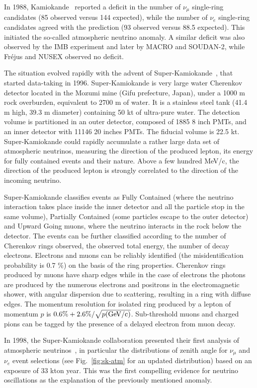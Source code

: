 In 1988, Kamiokande~\cite{kam88} reported a deficit in the number of $\nu_\mu$ single-ring candidates (85 observed versus 144 expected), while the number of $\nu_e$ single-ring candidates agreed with the prediction (93 observed versus 88.5 expected). 
This initiated the so-called atmospheric neutrino anomaly. A similar deficit was also observed by the IMB experiment and later by MACRO and SOUDAN-2, while Fr\'ejus and NUSEX observed no deficit. 

The situation evolved rapidly with the advent of Super-Kamiokande~\cite{sknim}, that started data-taking in 1996. Super-Kamiokande is very large water Cherenkov detector located in the Mozumi mine (Gifu prefecture, Japan), under a 1000 m rock overburden, equivalent to 2700 m of water. It is a stainless steel tank (41.4 m high, 39.3 m diameter) containing 50 kt of ultra-pure water. The detection volume is partitioned in an outer detector, composed of 1885 8 inch PMTs, and an inner detector with 11146 20 inches PMTs. The fiducial volume is 22.5 kt. Super-Kamiokande could rapidly accumulate a rather large data set of atmospheric neutrinos, measuring the direction of the produced lepton, its energy for fully contained events and their nature. Above a few hundred MeV/c, the direction of the produced lepton is strongly correlated to the direction of the incoming neutrino.

Super-Kamiokande classifies events as Fully Contained (where the neutrino interaction takes place inside the inner detector and all the particle stop in the same volume), Partially Contained (some particles escape to the outer detector) and Upward Going muons, where the neutrino interacts in the rock below the detector. The events can be further classified according to the number of Cherenkov rings observed, the observed total energy, the number of decay electrons. Electrons and muons can be reliably identified (the misidentification probability is 0.7 \%) on the basis of the ring properties. Cherenkov rings produced by muons have sharp edges while in the case of electrons the photons are produced by the numerous electrons and positrons in the electromagnetic shower, with angular dispersion due to scattering, resulting in a ring with diffuse edges. The momentum resolution for isolated ring produced by a lepton of momentum $p$ is $0.6\% +2.6\%/\sqrt{p ({\rm GeV/c})}$. Sub-threshold muons and charged pions can be tagged by the presence of a delayed electron from muon decay.

In 1998, the Super-Kamiokande collaboration presented their first analysis of atmospheric neutrinos~\cite{Fukuda:1998mi}, in particular the distributions of zenith angle for $ \nu_\mu$ and $\nu_e$ event selections (see Fig.~\ref{fig:sk-atm} for an updated distribution) based on an exposure of 33 kton year. This was the first compelling evidence for neutrino oscillations as the explanation of the previously mentioned anomaly.  

